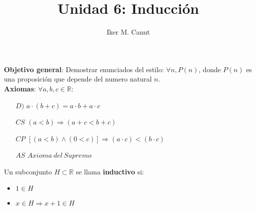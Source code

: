 \documentclass[11pt,a4paper]{article}
\author{Iker M. Canut}
\title{Unidad 6: Inducci\'on}
\begin{document}
\maketitle
\newpage

\textbf{Objetivo general}: Demostrar enunciados del estilo: $\forall n, P(n)$, donde $P(n)$ es una proposici\'on que depende del numero natural $n$.\\

\textbf{Axiomas}: $\forall a,b,c \in \mathbb{R}$:
\begin{enumerate}
\item [$D)$] $a \cdot (b + c) = a \cdot b + a \cdot c$
\item [$CS$] $(a < b) \Rightarrow (a+c < b+c)$
\item [$CP$] $[(a < b) \land (0 < c)] \Rightarrow (a \cdot c) < (b \cdot c)$
\item [$AS$] $Axioma\ del\ Supremo$
\end{enumerate}

\noindent \dotfill

Un subconjunto $H \subset \mathbb{R}$ se llama \textbf{inductivo} si:
\begin{itemize}
\item $1 \in H$
\item $x \in H \Rightarrow x+1 \in H$
\end{itemize}
\end{document}
